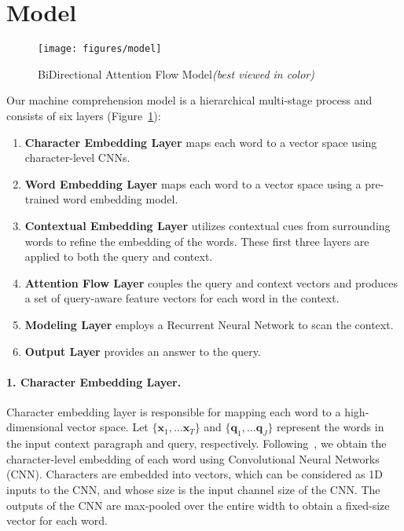 \documentclass{article} \usepackage{iclr2017_conference,times}
\begin{document}
\section{Model}\label{sec:model}

\begin{figure}[t]
\centering
\texttt{[image: figures/model]}
\caption{\small BiDirectional Attention Flow Model\space\space \textit{(best viewed in color)}}
\label{fig:model}
\end{figure}
Our machine comprehension model is a hierarchical multi-stage process and consists of six layers (Figure~\ref{fig:model}): 
\begin{enumerate}
    \item \textbf{Character Embedding Layer} maps each word to a vector space using character-level CNNs. \item \textbf{Word Embedding Layer} maps each word to a vector space using a pre-trained word embedding model. \item \textbf{Contextual Embedding Layer} utilizes contextual cues from surrounding words to refine the embedding of the words. These first three layers are applied to both the query and context.
    \item \textbf{Attention Flow Layer} couples the query and context vectors and produces a set of query-aware feature vectors for each word in the context.
    \item \textbf{Modeling Layer} employs a Recurrent Neural Network to scan the context.\item \textbf{Output Layer} provides an answer to the query.\end{enumerate}

\paragraph{1. Character Embedding Layer.}\label{subsec:char}
Character embedding layer is responsible for mapping each word to a high-dimensional vector space. Let $\{\bm{x}_1, \dots \bm{x}_T\}$ and $\{\bm{q}_1, \dots \bm{q}_J\}$ represent the words in the input context paragraph and query, respectively.
Following~\cite{char-cnn}, we obtain the character-level embedding of each word using Convolutional Neural Networks (CNN). Characters are embedded into vectors, which can be considered as 1D inputs to the CNN, and whose size is the input channel size of the CNN. The outputs of the CNN are max-pooled over the entire width to obtain a fixed-size vector for each word.  
\end{document}
